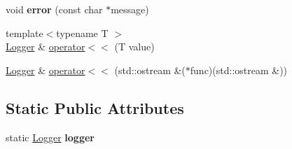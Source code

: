 \begin{DoxyCompactItemize}
\item 
\hypertarget{classtools_1_1Logger_a769bbaa6d8dcc4a10803107c01d1a42c}{void {\bfseries error} (const char $\ast$message)}\label{classtools_1_1Logger_a769bbaa6d8dcc4a10803107c01d1a42c}

\item 
{\footnotesize template$<$typename T $>$ }\\\hyperlink{classtools_1_1Logger}{Logger} \& \hyperlink{classtools_1_1Logger_a329a9574f28452d55118911d2ce428f8}{operator$<$$<$} (T value)
\item 
\hyperlink{classtools_1_1Logger}{Logger} \& \hyperlink{classtools_1_1Logger_aad70622a440e19c348291a46be9d0751}{operator$<$$<$} (std\-::ostream \&($\ast$func)(std\-::ostream \&))
\end{DoxyCompactItemize}
\subsection*{Static Public Attributes}
\begin{DoxyCompactItemize}
\item 
\hypertarget{classtools_1_1Logger_a341eaab3865b60362db6736c2e2b7c68}{static \hyperlink{classtools_1_1Logger}{Logger} {\bfseries logger}}\label{classtools_1_1Logger_a341eaab3865b60362db6736c2e2b7c68}

\end{DoxyCompactItemize}


